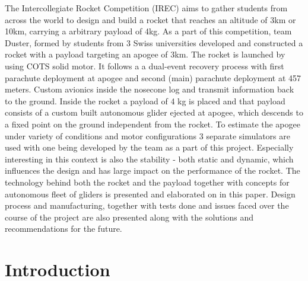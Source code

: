 \documentclass[]{iac}
\begin{document}
{The Intercollegiate Rocket Competition (IREC) aims to gather students from across the world to design and build a rocket that reaches an altitude of 3km or 10km, carrying a arbitrary payload of 4kg. As a part of this competition, team Duster, formed by students from 3 Swiss universities developed and constructed a rocket with a payload targeting an apogee of 3km. The rocket is launched by using COTS solid motor. It follows a a dual-event recovery process with first parachute deployment at apogee and second (main) parachute deployment at 457 meters.  Custom avionics inside the nosecone log and transmit information back to the ground.
Inside the rocket a payload of 4 kg is placed and that payload consists of a custom built autonomous glider ejected at apogee, which descends to a fixed point on the ground independent from the rocket. 
To estimate the apogee under variety of conditions and motor configurations 3 separate simulators are used with one being developed by the team as a part of this project. Especially interesting in this context is also the stability - both static and dynamic, which influences the design and has large impact on the performance of the rocket. 
The technology behind both the rocket and the payload together with concepts for autonomous fleet of gliders is presented and elaborated on in this paper. Design process and manufacturing, together with tests done and issues faced over the course of the project are also presented along with the solutions and recommendations for the future.
}

\maketitle
\section{Introduction}


\end{document}
